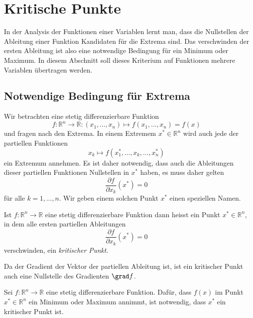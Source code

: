 %
%
%
\section{Kritische Punkte
\label{buch:fuvar:section:kritisch}}
In der Analysis der Funktionen einer Variablen lernt man, dass die
Nullstellen der Ableitung einer Funktion Kandidaten für die Extrema
sind.
Das verschwinden der ersten Ableitung ist also eine notwendige Bedingung
für ein Minimum oder Maximum.
In diesem Abschnitt soll dieses Kriterium auf Funktionen mehrere
Variablen übertragen werden.

%
%
\subsection{Notwendige Bedingung für Extrema}
Wir betrachten eine stetig differenzierbare Funktion 
\[
f
\colon
\mathbb{R}^n\to\mathbb{R}
:
(x_1,\dots,x_n) \mapsto f(x_1,\dots,x_n) = f(x)
\]
und fragen nach den Extrema.
In einem Extremem $x^*\in\mathbb{R}^n$ wird auch jede der partiellen
Funktionen
\[
x_k \mapsto f(x_1^*,\dots,x_k,\dots,x_n^*)
\]
ein Extremum annehmen.
Es ist daher notwendig, dass auch die Ableitungen dieser partiellen
Funktionen Nullstellen in $x^*$ haben, es muss daher gelten
\begin{equation*}
\frac{\partial f}{\partial x_k}(x^*) = 0
\end{equation*}
für alle $k=1,\dots,n$.
Wir geben einem solchen Punkt $x^*$ einen speziellen Namen.

\begin{definition}
Ist $f\colon \mathbb{R}^n\to\mathbb{R}$ eine stetig differenzierbare
Funktion dann heisst ein Punkt $x^*\in\mathbb{R}^n$, in dem alle
ersten partiellen Ableitungen
\begin{equation}
\frac{\partial f}{\partial x_k}(x^*) = 0
\end{equation}
verschwinden, ein {\em kritischer Punkt}.
\end{definition}

Da der Gradient der Vektor der partiellen Ableitung ist, ist ein
kritischer Punkt auch eine Nullstelle des Gradienten $\grad f$.

\begin{satz}
Sei $f\colon\mathbb{R}^n\to\mathbb{R}$ eine stetig differenzierbare
Funktion.
Dafür, dass $f(x)$ im Punkt $x^*\in\mathbb{R}^n$ ein Minimum oder Maximum
annimmt, ist notwendig, dass $x^*$ ein kritischer Punkt ist.
\end{satz}

